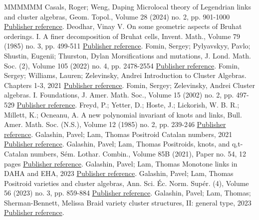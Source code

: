 \documentclass[11pt]{article}
\theoremstyle{definition}
\numberwithin{equation}{section}
\begin{document}
\begin{thebibliography}{MMMMMM}
 Casals, Roger; Weng, Daping Microlocal theory of Legendrian links and cluster algebras, Geom. Topol., Volume 28 (2024) no. 2, pp. 901-1000 \href{https://alco.centre-mersenne.org/articles/10.5802/alco.345/#CW}{Publisher reference}.
 Deodhar, Vinay V. On some geometric aspects of Bruhat orderings. I. A finer decomposition of Bruhat cells, Invent. Math., Volume 79 (1985) no. 3, pp. 499-511 \href{https://alco.centre-mersenne.org/articles/10.5802/alco.345/#Deodhar}{Publisher reference}.
 Fomin, Sergey; Pylyavskyy, Pavlo; Shustin, Eugenii; Thurston, Dylan Morsifications and mutations, J. Lond. Math. Soc. (2), Volume 105 (2022) no. 4, pp. 2478-2554 \href{https://alco.centre-mersenne.org/articles/10.5802/alco.345/#FPST}{Publisher reference}.
 Fomin, Sergey; Williams, Lauren; Zelevinsky, Andrei Introduction to Cluster Algebras. Chapters 1-3, 2021 \href{https://alco.centre-mersenne.org/articles/10.5802/alco.345/#FWZ_book}{Publisher reference}.
 Fomin, Sergey; Zelevinsky, Andrei Cluster algebras. I. Foundations, J. Amer. Math. Soc., Volume 15 (2002) no. 2, pp. 497-529 \href{https://alco.centre-mersenne.org/articles/10.5802/alco.345/#FZ}{Publisher reference}.
 Freyd, P.; Yetter, D.; Hoste, J.; Lickorish, W. B. R.; Millett, K.; Ocneanu, A. A new polynomial invariant of knots and links, Bull. Amer. Math. Soc. (N.S.), Volume 12 (1985) no. 2, pp. 239-246 \href{https://alco.centre-mersenne.org/articles/10.5802/alco.345/#HOMFLY}{Publisher reference}.
 Galashin, Pavel; Lam, Thomas Positroid Catalan numbers, 2021 \href{https://alco.centre-mersenne.org/articles/10.5802/alco.345/#GL_cat_combin}{Publisher reference}.
 Galashin, Pavel; Lam, Thomas Positroids, knots, and q,t-Catalan numbers, Sém. Lothar. Combin., Volume 85B (2021), Paper no. 54, 12 pages \href{https://alco.centre-mersenne.org/articles/10.5802/alco.345/#GL_qtcat}{Publisher reference}.
 Galashin, Pavel; Lam, Thomas Monotone links in DAHA and EHA, 2023 \href{https://alco.centre-mersenne.org/articles/10.5802/alco.345/#GL_EHA}{Publisher reference}.
 Galashin, Pavel; Lam, Thomas Positroid varieties and cluster algebras, Ann. Sci. Éc. Norm. Supér. (4), Volume 56 (2023) no. 3, pp. 859-884 \href{https://alco.centre-mersenne.org/articles/10.5802/alco.345/#GL_cluster}{Publisher reference}.
 Galashin, Pavel; Lam, Thomas; Sherman-Bennett, Melissa Braid variety cluster structures, II: general type, 2023 \href{https://alco.centre-mersenne.org/articles/10.5802/alco.345/#GLSBS2}{Publisher reference}.

\end{thebibliography}
\end{document}
